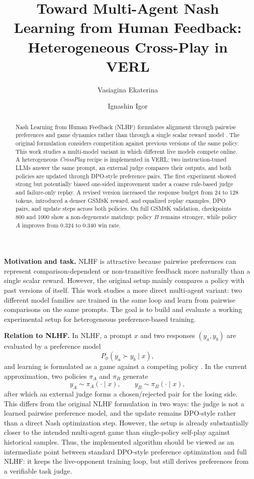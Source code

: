 \documentclass[10pt,a4paper]{article}
\title{\vspace{-1em}Toward Multi-Agent Nash Learning from Human Feedback: \\ Heterogeneous Cross-Play in VERL}
\author{}
\author{Vasiagina Ekaterina \and Ignashin Igor}
\date{}
\begin{document}
\maketitle
\vspace{-1.4em}

\begin{abstract}
Nash Learning from Human Feedback (NLHF) formulates alignment through pairwise preferences and game dynamics rather than through a single scalar reward model \cite{nlhf}. The original formulation considers competition against previous versions of the same policy. This work studies a multi-model variant in which different live models compete online. A heterogeneous \textit{CrossPlay} recipe is implemented in VERL: two instruction-tuned LLMs answer the same prompt, an external judge compares their outputs, and both policies are updated through DPO-style preference pairs. The first experiment showed strong but potentially biased one-sided improvement under a coarse rule-based judge and failure-only replay. A revised version increased the response budget from 24 to 128 tokens, introduced a denser GSM8K reward, and equalized replay examples, DPO pairs, and update steps across both policies. On full GSM8K validation, checkpoints 800 and 1000 show a non-degenerate matchup: policy $B$ remains stronger, while policy $A$ improves from 0.324 to 0.340 win rate.
\end{abstract}

\textbf{Motivation and task.}
NLHF is attractive because pairwise preferences can represent comparison-dependent or non-transitive feedback more naturally than a single scalar reward. However, the original setup mainly compares a policy with past versions of itself. This work studies a more direct multi-agent variant: two different model families are trained in the same loop and learn from pairwise comparisons on the same prompts. The goal is to build and evaluate a working experimental setup for heterogeneous preference-based training.

\textbf{Relation to NLHF.}
In NLHF, a prompt $x$ and two responses $(y_a,y_b)$ are evaluated by a preference model
\[
P_\phi(y_a \succ y_b \mid x),
\]
and learning is formulated as a game against a competing policy \cite{nlhf}. In the current approximation, two policies $\pi_A$ and $\pi_B$ generate
\[
y_A \sim \pi_A(\cdot \mid x), \qquad y_B \sim \pi_B(\cdot \mid x),
\]
after which an external judge forms a chosen/rejected pair for the losing side. This differs from the original NLHF formulation in two ways: the judge is not a learned pairwise preference model, and the update remains DPO-style rather than a direct Nash optimization step. However, the setup is already substantially closer to the intended multi-agent game than single-policy self-play against historical samples.
Thus, the implemented algorithm should be viewed as an intermediate point between standard DPO-style preference optimization and full NLHF: it keeps the live-opponent training loop, but still derives preferences from a verifiable task judge.
\end{document}
